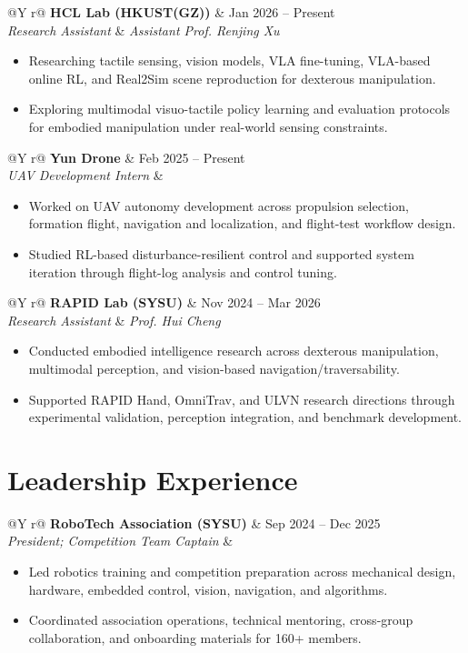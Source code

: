 \documentclass[10pt,letterpaper]{article}
\makeatletter
\newcommand{\cventry}[4]{%
  \begin{tabularx}{\textwidth}{@{}Y r@{}}
    \textbf{#1} & #2 \\
    \textit{#3} & \textit{#4}
  \end{tabularx}
}
\newenvironment{cvitems}
  {\begin{itemize}[leftmargin=1.25em,itemsep=2pt,topsep=3pt,parsep=0pt,partopsep=0pt]}
  {\end{itemize}}
\makeatother
\begin{document}
\cventry{HCL Lab (HKUST(GZ))}
{Jan 2026 -- Present}
{Research Assistant}{Assistant Prof. Renjing Xu}
\begin{cvitems}
  \item Researching tactile sensing, vision models, VLA fine-tuning, VLA-based online RL, and Real2Sim scene reproduction for dexterous manipulation.
  \item Exploring multimodal visuo-tactile policy learning and evaluation protocols for embodied manipulation under real-world sensing constraints.
\end{cvitems}

\cventry{Yun Drone}
{Feb 2025 -- Present}
{UAV Development Intern}{}
\begin{cvitems}
  \item Worked on UAV autonomy development across propulsion selection, formation flight, navigation and localization, and flight-test workflow design.
  \item Studied RL-based disturbance-resilient control and supported system iteration through flight-log analysis and control tuning.
\end{cvitems}

\cventry{RAPID Lab (SYSU)}
{Nov 2024 -- Mar 2026}
{Research Assistant}{Prof. Hui Cheng}
\begin{cvitems}
  \item Conducted embodied intelligence research across dexterous manipulation, multimodal perception, and vision-based navigation/traversability.
  \item Supported RAPID Hand, OmniTrav, and ULVN research directions through experimental validation, perception integration, and benchmark development.
\end{cvitems}

\newpage

\section*{Leadership Experience}

\cventry{RoboTech Association (SYSU)}
{Sep 2024 -- Dec 2025}
{President; Competition Team Captain}{}
\begin{cvitems}
  \item Led robotics training and competition preparation across mechanical design, hardware, embedded control, vision, navigation, and algorithms.
  \item Coordinated association operations, technical mentoring, cross-group collaboration, and onboarding materials for 160+ members.
\end{cvitems}
\end{document}
